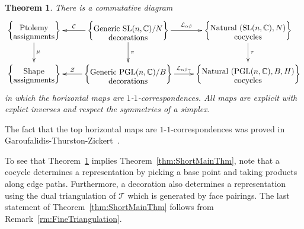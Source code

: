 \documentclass[12pt]{amsart}
\newtheorem{theorem}{Theorem}[section]
\theoremstyle{definition}
\newtheorem{corollary}[theorem]{Corollary}
\numberwithin{equation}{section}
\def\cxymatrix#1{\xy*[c]\xybox{\xymatrix#1}\endxy}
\def\SL{\mathrm{SL}}
\def\PGL{\mathrm{PGL}}
\def\C{\mathbb{C}}
\def\T{\mathcal{T}}
\begin{document}
\begin{theorem}\label{thm:MainThm}
There is a commutative diagram
\begin{equation} \label{eqn:DiagramIntro}
\cxymatrix{{
\left\{\txt{\textnormal{Ptolemy}\\\textnormal{assignments}}\right\} 
\ar[d]^\mu & \ar[d]^\pi \ar_-{\mathcal C}[l] \left\{\txt{\textnormal{Generic} $\SL(n,\C)/N$\\\textnormal{decorations}}\right\} \ar^-{\mathcal L_{\alpha\beta}}[r] & \ar[d]^\tau \left\{\txt{\textnormal{Natural} $(\SL(n,\C),N)$\\\textnormal{cocycles}}\right\}\\
\left\{\txt{\textnormal{Shape}\\\textnormal{assignments}}\right\} 
& \ar_-{\mathcal Z}[l] \left\{\txt{\textnormal{Generic} $\PGL(n,\C)/B$\\\textnormal{decorations}}\right\} \ar^-{\mathcal L_{\alpha\beta\gamma}}[r] & \left\{\txt{\textnormal{Natural} $(\PGL(n,\C),B,H)$\\\textnormal{cocycles}}\right\}
}}
\end{equation}
in which the horizontal maps are $1$-$1$-correspondences. All maps are explicit with explict inverses and respect the symmetries of a simplex.
\end{theorem}
The fact that the top horizontal maps are $1$-$1$-correspondences was proved in Garoufalidis-Thurston-Zickert~\cite{GaroufalidisThurstonZickert}.

To see that Theorem~\ref{thm:MainThm} implies Theorem~\ref{thm:ShortMainThm}, note that a cocycle determines a representation by picking a base point and taking products along edge paths. Furthermore, a decoration also determines a representation using the dual triangulation of $\T$ which is generated by face pairings. The last statement of Theorem~\ref{thm:ShortMainThm} follows from Remark~\ref{rm:FineTriangulation}. %

\end{document}
